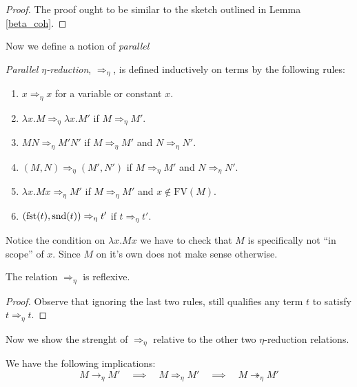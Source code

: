\begin{proof}
    The proof ought to be similar to the sketch outlined in Lemma \ref{beta_coh}.
\end{proof}

Now we define a notion of \emph{parallel}

\begin{defin}\label{eta_par}
    \emph{Parallel $\eta$-reduction}, $\Rightarrow_\eta$, is defined inductively on terms by the following rules:
    \begin{enumerate}
        \item $x \Rightarrow_\eta x$ for a variable or constant $x$.
        \item $\lambda x . M \Rightarrow_\eta \lambda x . M'$ if $M \Rightarrow_\eta M'$.
        \item $M N \Rightarrow_\eta M' N'$ if $M \Rightarrow_\eta M'$ and $N \Rightarrow_\eta N'$.
        \item $(M, N) \Rightarrow_\eta (M', N')$ if $M \Rightarrow_\eta M'$ and $N \Rightarrow_\eta N'$.
        \item $\lambda x . M x \Rightarrow_\eta M'$ if $M \Rightarrow_\eta M'$ and $x \not\in \mathrm{FV}(M)$.
        \item $(\mathrm{fst}(t), \mathrm{snd}(t)) \Rightarrow_\eta t'$ if $t \Rightarrow_\eta t'$.
    \end{enumerate}
\end{defin}

\begin{remark}
    Notice the condition on $\lambda x . M x$ we have to check that $M$ is specifically not ``in scope'' of $x$. Since $M$ on it's own does not make sense otherwise.
\end{remark}

\begin{cor}
    The relation $\Rightarrow_\eta$ is reflexive.
\end{cor}

\begin{proof}
    Observe that ignoring the last two rules, still qualifies any term $t$ to satisfy $t \Rightarrow_\eta t$.
\end{proof}

Now we show the strenght of $\Rightarrow_\eta$ relative to the other two $\eta$-reduction relations.

\begin{lemma}\label{eta_par_imp}
    We have the following implications:
    $$
        M \to_\eta M' \quad \implies \quad M \Rightarrow_\eta M' \quad \implies \quad M \twoheadrightarrow_\eta M'
    $$
\end{lemma}

